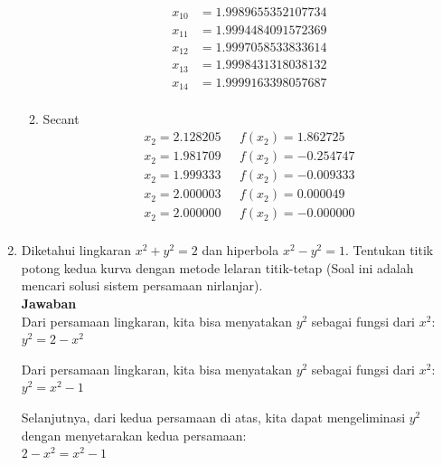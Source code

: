 \documentclass[fleqn]{article}
\newcommand{\jaw}{\\ \textbf{Jawaban} \\}
\begin{document}
\begin{enumerate}
\begin{enumerate}[label=\roman*.]
\begin{align*}
						x_10 &= 1.9989655352107734\\
						x_11 &= 1.9994484091572369\\
						x_12 &= 1.9997058533833614\\
						x_13 &= 1.9998431318038132\\
						x_14 &= 1.9999163398057687\\
					\end{align*}
				\item Secant \\ 
					\begin{align*}
						x_2 = 2.128205&\text{ }f(x_2) = 1.862725\\
						x_2 = 1.981709&\text{ }f(x_2) = -0.254747\\
						x_2 = 1.999333&\text{ }f(x_2) = -0.009333\\
						x_2 = 2.000003&\text{ }f(x_2) = 0.000049\\
						x_2 = 2.000000&\text{ }f(x_2) = -0.000000\\
					\end{align*}
			\end{enumerate}
		\item Diketahui lingkaran $x^2 + y^2 = 2$ dan hiperbola $x^2 - y^2 = 1$. Tentukan titik potong kedua kurva dengan metode lelaran titik-tetap (Soal ini adalah mencari solusi sistem persamaan nirlanjar).
			\jaw 
			Dari persamaan lingkaran, kita bisa menyatakan $y^2$ sebagai fungsi dari $x^2$: \\
			$y^2=2−x^2$

			Dari persamaan lingkaran, kita bisa menyatakan $y^2$ sebagai fungsi dari $x^2$: \\
			$y^2=x^2−1$

			Selanjutnya, dari kedua persamaan di atas, kita dapat mengeliminasi $y^2$ dengan menyetarakan kedua persamaan: \\
			$2−x^2=x^2−1$


\end{enumerate}
\end{document}
